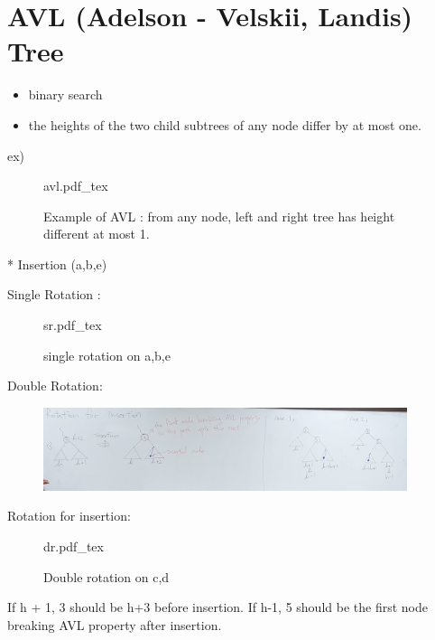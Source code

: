 \documentclass[12pt]{article}
\begin{document}
\maketitle


\section{AVL (Adelson - Velskii, Landis) Tree}

\begin{itemize}
  \item binary search
  \item the heights of the two child subtrees of any node differ by at most one.
\end{itemize}

ex)

\begin{figure}[H]
	\centering
	\def\svgwidth{\columnwidth}
	{avl.pdf_tex}
	\caption{Example of AVL : from any node, left and right tree has height different at most 1.}
	\label{fig:avl}
\end{figure}

* Insertion (a,b,e)

Single Rotation :

\begin{figure}[H]
	\centering
	\def\svgwidth{\columnwidth}
	{sr.pdf_tex}
	\caption{single rotation on a,b,e}
	\label{fig:sr}
\end{figure}

Double Rotation:
\begin{figure}[H]
	\centering
	\includegraphics[width=0.95\textwidth]{img/doublerot.png}
	\caption{}
	\label{}
\end{figure}


Rotation for insertion:

\begin{figure}[H]
	\centering
	\def\svgwidth{\columnwidth}
	{dr.pdf_tex}
	\caption{Double rotation on c,d}
	\label{fig:dr}
\end{figure}

If h + 1, 3 should be h+3 before insertion.
If h-1, 5 should be the first node breaking AVL property after insertion.
\end{document}
